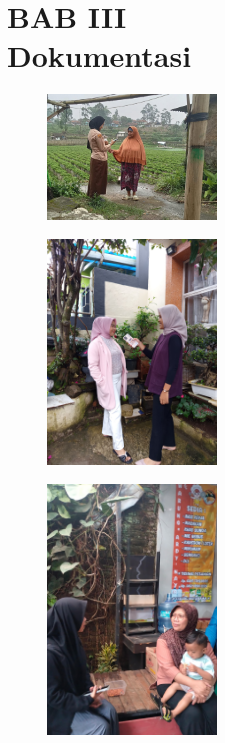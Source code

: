 \documentclass[a4paper,12pt, left=3cm,right=2cm,bottom=2cm, bahasa]{article}
\begin{document}
\section*{BAB III \\  Dokumentasi}
\begin{figure}[H]
  \begin{center}
    \includegraphics[width=0.4\textwidth]{images/gambar1.jpeg}
  \end{center}
\end{figure}
\begin{figure}[H]

  \begin{center}
    \includegraphics[width=0.4\textwidth]{images/gambar2.jpeg}
  \end{center}
\end{figure}
\begin{figure}[H]

  \begin{center}
    \includegraphics[width=0.4\textwidth]{images/gambar3.jpeg}
  \end{center}
\end{figure}
\end{document}
